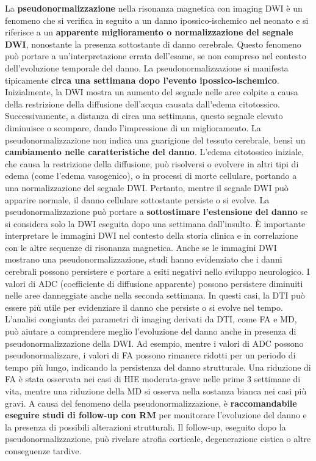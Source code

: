 La \textbf{pseudonormalizzazione} nella risonanza magnetica con imaging DWI è un fenomeno che si verifica in seguito a un danno ipossico-ischemico nel neonato e si riferisce a un \textbf{apparente miglioramento o normalizzazione del segnale DWI}, nonostante la presenza sottostante di danno cerebrale. Questo fenomeno può portare a un'interpretazione errata dell'esame, se non compreso nel contesto dell'evoluzione temporale del danno.
La pseudonormalizzazione si manifesta tipicamente \textbf{circa una settimana dopo l'evento ipossico-ischemico}. Inizialmente, la DWI mostra un aumento del segnale nelle aree colpite a causa della restrizione della diffusione dell'acqua causata dall'edema citotossico. Successivamente, a distanza di circa una settimana, questo segnale elevato diminuisce o scompare, dando l'impressione di un miglioramento. La pseudonormalizzazione non indica una guarigione del tessuto cerebrale, bensì un \textbf{cambiamento nelle caratteristiche del danno}. L'edema citotossico iniziale, che causa la restrizione della diffusione, può risolversi o evolvere in altri tipi di edema (come l'edema vasogenico), o in processi di morte cellulare, portando a una normalizzazione del segnale DWI. Pertanto, mentre il segnale DWI può apparire normale, il danno cellulare sottostante persiste o si evolve. La pseudonormalizzazione può portare a \textbf{sottostimare l'estensione del danno} se si considera solo la DWI eseguita dopo una settimana dall'insulto. È importante interpretare le immagini DWI nel contesto della storia clinica e in correlazione con le altre sequenze di risonanza magnetica. Anche se le immagini DWI mostrano una pseudonormalizzazione, studi hanno evidenziato che i danni cerebrali possono persistere e portare a esiti negativi nello sviluppo neurologico. I valori di ADC (coefficiente di diffusione apparente) possono persistere diminuiti nelle aree danneggiate anche nella seconda settimana. In questi casi, la DTI può essere più utile per evidenziare il danno che persiste o si evolve nel tempo. L'analisi congiunta dei parametri di imaging derivati da DTI, come FA e MD, può aiutare a comprendere meglio l'evoluzione del danno anche in presenza di pseudonormalizzazione della DWI. Ad esempio, mentre i valori di ADC possono pseudonormalizzare, i valori di FA possono rimanere ridotti per un periodo di tempo più lungo, indicando la persistenza del danno strutturale. Una riduzione di FA è stata osservata nei casi di HIE moderata-grave nelle prime 3 settimane di vita, mentre una riduzione della MD si osserva nella sostanza bianca nei casi più gravi. A causa del fenomeno della pseudonormalizzazione, è \textbf{raccomandabile eseguire studi di follow-up con RM} per monitorare l'evoluzione del danno e la presenza di possibili alterazioni strutturali. Il follow-up, eseguito dopo la pseudonormalizzazione, può rivelare atrofia corticale, degenerazione cistica o altre conseguenze tardive.

